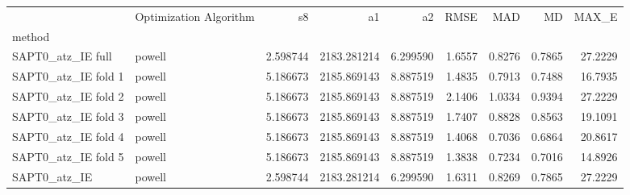 \begin{tabular}{llrrrrrrr}
 & Optimization Algorithm & s8 & a1 & a2 & RMSE & MAD & MD & MAX_E \\
method &  &  &  &  &  &  &  &  \\
SAPT0_atz_IE full & powell & 2.598744 & 2183.281214 & 6.299590 & 1.6557 & 0.8276 & 0.7865 & 27.2229 \\
SAPT0_atz_IE fold 1 & powell & 5.186673 & 2185.869143 & 8.887519 & 1.4835 & 0.7913 & 0.7488 & 16.7935 \\
SAPT0_atz_IE fold 2 & powell & 5.186673 & 2185.869143 & 8.887519 & 2.1406 & 1.0334 & 0.9394 & 27.2229 \\
SAPT0_atz_IE fold 3 & powell & 5.186673 & 2185.869143 & 8.887519 & 1.7407 & 0.8828 & 0.8563 & 19.1091 \\
SAPT0_atz_IE fold 4 & powell & 5.186673 & 2185.869143 & 8.887519 & 1.4068 & 0.7036 & 0.6864 & 20.8617 \\
SAPT0_atz_IE fold 5 & powell & 5.186673 & 2185.869143 & 8.887519 & 1.3838 & 0.7234 & 0.7016 & 14.8926 \\
SAPT0_atz_IE & powell & 2.598744 & 2183.281214 & 6.299590 & 1.6311 & 0.8269 & 0.7865 & 27.2229 \\
\end{tabular}
